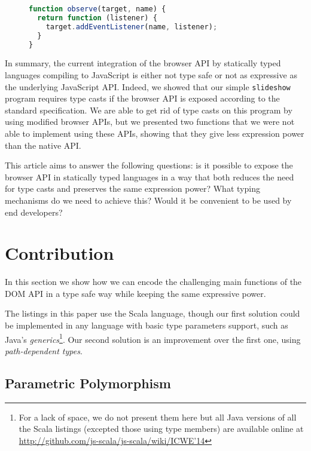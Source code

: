 \documentclass{llncs}
\newcommand{\jscode}[1]{\lstinline[language=JavaScript]|#1|}
\begin{document}
\begin{figure}
\begin{lstlisting}[label=lst-js-react,language=JavaScript,caption={Partial application of \jscode{addEventListener} parameters}]
function observe(target, name) {
  return function (listener) {
    target.addEventListener(name, listener);
  }
}
\end{lstlisting}
\end{figure}

In summary, the current integration of the browser API by statically typed languages compiling to JavaScript is either not type safe or not as expressive as the underlying JavaScript API. Indeed, we showed that our simple \jscode{slideshow} program requires type casts if the browser API is exposed according to the standard specification. We are able to get rid of type casts on this program by using modified browser APIs, but we presented two functions that we were not able to implement using these APIs, showing that they give less expression power than the native API.

This article aims to answer the following questions: is it possible to expose the browser API in statically typed languages in a way that both reduces the need for type casts and preserves the same expression power? What typing mechanisms do we need to achieve this? Would it be convenient to be used by end developers?

\section{Contribution}
\label{sec-contribution}

In this section we show how we can encode the challenging main functions of the DOM API in a type safe way while keeping the same expressive power.

The listings in this paper use the Scala language, though our first solution could be implemented in any language with basic type parameters support, such as Java's \emph{generics}\footnote{For a lack of space, we do not present them here but all Java versions of all the Scala listings (excepted those using type members) are available online at \href{http://github.com/js-scala/js-scala/wiki/ICWE'14}{http://github.com/js-scala/js-scala/wiki/ICWE'14}}. Our second solution is an improvement over the first one, using \emph{path-dependent types}.

\subsection{Parametric Polymorphism}
\end{document}
